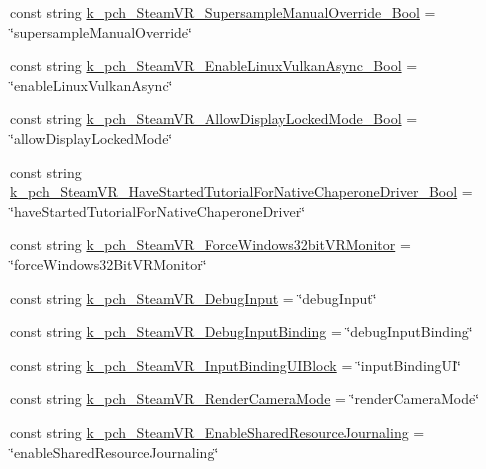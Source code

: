 \begin{DoxyCompactItemize}
\item 
const string \mbox{\hyperlink{class_valve_1_1_v_r_1_1_open_v_r_a2a13e5ba3ac8edcb1e8ef77334ad260f}{k\+\_\+pch\+\_\+\+Steam\+V\+R\+\_\+\+Supersample\+Manual\+Override\+\_\+\+Bool}} = \char`\"{}supersample\+Manual\+Override\char`\"{}
\item 
const string \mbox{\hyperlink{class_valve_1_1_v_r_1_1_open_v_r_a3e6d84fc5baaf3372ba213c25c0cc53b}{k\+\_\+pch\+\_\+\+Steam\+V\+R\+\_\+\+Enable\+Linux\+Vulkan\+Async\+\_\+\+Bool}} = \char`\"{}enable\+Linux\+Vulkan\+Async\char`\"{}
\item 
const string \mbox{\hyperlink{class_valve_1_1_v_r_1_1_open_v_r_a57390d1586e1d69742ab24d7470df63d}{k\+\_\+pch\+\_\+\+Steam\+V\+R\+\_\+\+Allow\+Display\+Locked\+Mode\+\_\+\+Bool}} = \char`\"{}allow\+Display\+Locked\+Mode\char`\"{}
\item 
const string \mbox{\hyperlink{class_valve_1_1_v_r_1_1_open_v_r_ad30d8462034d02f013e7cab8174b00d2}{k\+\_\+pch\+\_\+\+Steam\+V\+R\+\_\+\+Have\+Started\+Tutorial\+For\+Native\+Chaperone\+Driver\+\_\+\+Bool}} = \char`\"{}have\+Started\+Tutorial\+For\+Native\+Chaperone\+Driver\char`\"{}
\item 
const string \mbox{\hyperlink{class_valve_1_1_v_r_1_1_open_v_r_a4b7e89de1a947f109e3d7244e3a04546}{k\+\_\+pch\+\_\+\+Steam\+V\+R\+\_\+\+Force\+Windows32bit\+V\+R\+Monitor}} = \char`\"{}force\+Windows32\+Bit\+V\+R\+Monitor\char`\"{}
\item 
const string \mbox{\hyperlink{class_valve_1_1_v_r_1_1_open_v_r_ad87e25e3bb911dac602c99116dfb8aaa}{k\+\_\+pch\+\_\+\+Steam\+V\+R\+\_\+\+Debug\+Input}} = \char`\"{}debug\+Input\char`\"{}
\item 
const string \mbox{\hyperlink{class_valve_1_1_v_r_1_1_open_v_r_a95d76f399e9402315d3090956ddb7e50}{k\+\_\+pch\+\_\+\+Steam\+V\+R\+\_\+\+Debug\+Input\+Binding}} = \char`\"{}debug\+Input\+Binding\char`\"{}
\item 
const string \mbox{\hyperlink{class_valve_1_1_v_r_1_1_open_v_r_ad5bb21bb3cd98c4b6893585da3502156}{k\+\_\+pch\+\_\+\+Steam\+V\+R\+\_\+\+Input\+Binding\+U\+I\+Block}} = \char`\"{}input\+Binding\+UI\char`\"{}
\item 
const string \mbox{\hyperlink{class_valve_1_1_v_r_1_1_open_v_r_a787fa653629ec78c3613e1dec3940140}{k\+\_\+pch\+\_\+\+Steam\+V\+R\+\_\+\+Render\+Camera\+Mode}} = \char`\"{}render\+Camera\+Mode\char`\"{}
\item 
const string \mbox{\hyperlink{class_valve_1_1_v_r_1_1_open_v_r_acf914e9d5816c430d30bc8f53fa1bda5}{k\+\_\+pch\+\_\+\+Steam\+V\+R\+\_\+\+Enable\+Shared\+Resource\+Journaling}} = \char`\"{}enable\+Shared\+Resource\+Journaling\char`\"{}

\end{DoxyCompactItemize}
